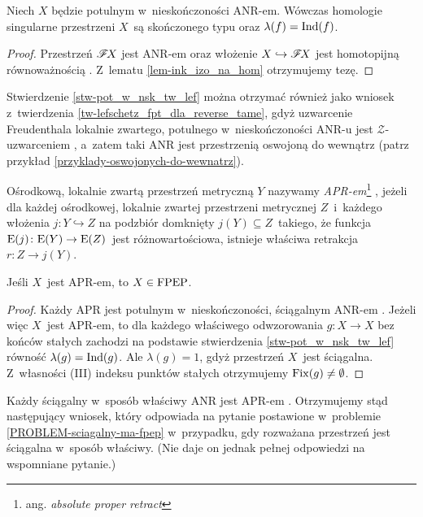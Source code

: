 \begin{stw}\label{stw-pot_w_nsk_tw_lef}
Niech $X$ będzie potulnym w~nieskończoności \mbox{ANR-em}. Wówczas homologie singularne przestrzeni $X$~są skończonego typu oraz $\lambda(f)=\operatorname{Ind}(f)$.
\end{stw}
\begin{proof}
Przestrzeń $\mathscr{F}\! X$ jest \mbox{ANR-em} \cite[Theorem 4.2]{Sher76} oraz włożenie $X\hookrightarrow\mathscr{F}\! X$ jest homotopijną równoważnością \cite[Theorem 4.4]{Sher76}. Z~lematu \ref{lem-ink_izo_na_hom} otrzymujemy tezę.
\end{proof}

\begin{uw}
Stwierdzenie \ref{stw-pot_w_nsk_tw_lef} można otrzymać również jako wniosek z~twierdzenia \ref{tw-lefschetz_fpt_dla_reverse_tame}, gdyż uzwarcenie Freudenthala lokalnie zwartego, potulnego w~nieskończoności ANR-u jest $\mathcal{Z}$-uzwarceniem \cite[Theorem 4.4]{Sher76}, a~zatem taki ANR jest przestrzenią oswojoną do wewnątrz (patrz przykład \ref{przyklady-oswojonych-do-wewnatrz}).
\end{uw}

Ośrodkową, lokalnie zwartą przestrzeń metryczną $Y$ nazywamy \textit{APR-em}\footnote{ang. \textit{absolute proper retract}} \cite{Sher75}, jeżeli dla każdej ośrodkowej, lokalnie zwartej przestrzeni metrycznej $Z$~i~każdego włożenia $j\colon Y\hookrightarrow Z$ na podzbiór domknięty $j(Y)\subseteq Z$~takiego, że funkcja $\mathrm{E}(j)\colon \mathrm{E}(Y)\to \mathrm{E}(Z)$~jest różnowartościowa, istnieje właściwa retrakcja $r\colon Z\to j(Y)$.

\begin{wn}
Jeśli $X$~jest \mbox{APR-em}, to $X\in\mathrm{FPEP}$.
\end{wn}
\begin{proof}
Każdy \mbox{APR} jest potulnym w~nieskończoności, ściągalnym \mbox{ANR-em} \cite[Theorem 4.5]{Sher76}. Jeżeli więc $X$~jest APR-em, to dla każdego właściwego odwzorowania $g\colon X\to X$ bez końców stałych zachodzi na podstawie stwierdzenia \ref{stw-pot_w_nsk_tw_lef} równość $\lambda(g)=\operatorname{Ind}(g)$. Ale $\lambda(g)=1$, gdyż przestrzeń $X$~jest ściągalna. Z~własności (III) indeksu punktów stałych otrzymujemy $\operatorname{Fix}(g)\not=\emptyset$. 
\end{proof}

Każdy ściągalny w~sposób właściwy ANR jest APR-em \cite[Theorem 4.1]{Sher75}. Otrzymujemy stąd następujący wniosek, który odpowiada na pytanie postawione w~problemie \ref{PROBLEM-sciagalny-ma-fpep} w~przypadku, gdy rozważana przestrzeń jest ściągalna w~sposób właściwy. (Nie daje on jednak pełnej odpowiedzi na wspomniane pytanie.)

